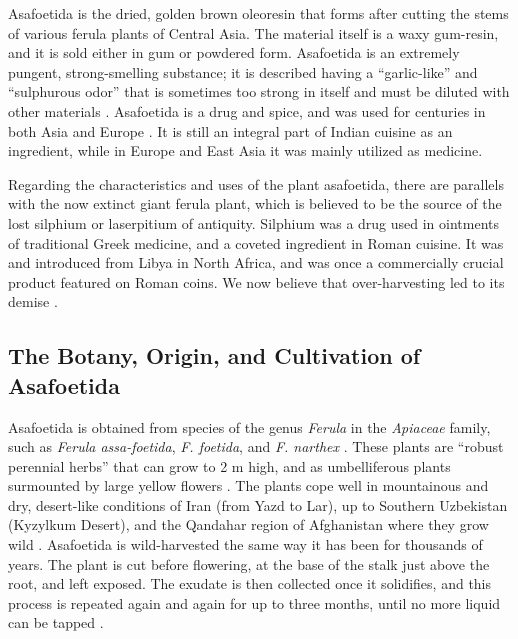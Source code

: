 Asafoetida is the dried, golden brown oleoresin that forms after cutting the stems of various ferula plants of Central Asia. The material itself is a waxy gum-resin, and it is sold either in gum or powdered form. Asafoetida is an extremely pungent, strong-smelling substance; it is described having a ``garlic-like'' and ``sulphurous odor'' that is sometimes too strong in itself and must be diluted with other materials \autocite[138]{van_wyk_culinary_2014}. Asafoetida is a drug and spice, and was used for centuries in both Asia and Europe \autocite{leung_itinerary_2019}. It is still an integral part of Indian cuisine as an ingredient, while in Europe and East Asia it was mainly utilized as medicine.

Regarding the characteristics and uses of the plant asafoetida, there are parallels with the now extinct giant ferula plant, which is believed to be the source of the lost silphium or laserpitium of antiquity. Silphium was a drug used in ointments of traditional Greek medicine, and a coveted ingredient in Roman cuisine. It was and introduced from Libya in North Africa, and was once a commercially crucial product featured on Roman coins. We now believe that over-harvesting led to its demise \autocites{dalby_dangerous_2000, leung_itinerary_2019, van_wyk_culinary_2014, langenheim_plant_2003}. 

\subsection{The Botany, Origin, and  Cultivation of Asafoetida}

Asafoetida is obtained from species of the genus \textit{Ferula} in the \textit{Apiaceae} family, such as \textit{Ferula assa-foetida}, \textit{F. foetida}, and \textit{F. narthex} \autocite{mabberley_mabberleys_2017}. These plants are ``robust perennial herbs'' that can grow to 2 m high, and as umbelliferous plants surmounted by large yellow flowers \autocite[138]{van_wyk_culinary_2014}.
The plants cope well in mountainous and dry, desert-like conditions of Iran (from Yazd to Lar), up to Southern Uzbekistan (Kyzylkum Desert), and the Qandahar region of Afghanistan where they grow wild \autocite{leung_itinerary_2019}.
Asafoetida is wild-harvested the same way it has been for thousands of years. The plant is cut before flowering, at the base of the stalk just above the root, and left exposed. The exudate is then collected once it solidifies, and this process is repeated again and again for up to three months, until no more liquid can be tapped \autocite[138]{van_wyk_culinary_2014}.

